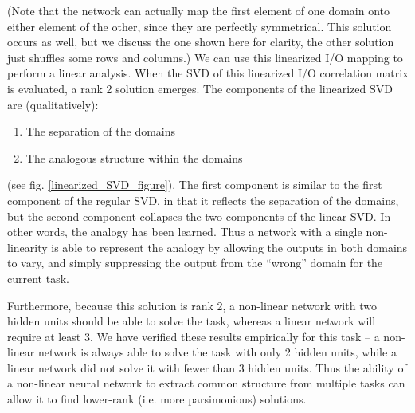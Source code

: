 \documentclass[10pt,letterpaper]{article}
\begin{document}
(Note that the network can actually map the first element of one domain onto either element of the other, since they are perfectly symmetrical. This solution occurs as well, but we discuss the one shown here for clarity, the other solution just shuffles some rows and columns.) We can use this linearized I/O mapping to perform a linear analysis. When the SVD of this linearized I/O correlation matrix is evaluated, a rank 2 solution emerges. The components of the linearized SVD are (qualitatively): \begin{enumerate}
\itemsep-0.25em
\item The separation of the domains
\item The analogous structure within the domains
\end{enumerate}
(see fig. \ref{linearized_SVD_figure}). The first component is similar to the first component of the regular SVD, in that it reflects the separation of the domains, but the second component collapses the two components of the linear SVD. In other words, the analogy has been learned. Thus a network with a single non-linearity is able to represent the analogy by allowing the outputs in both domains to vary, and simply suppressing the output from the ``wrong'' domain for the current task.\par
Furthermore, because this solution is rank 2, a non-linear network with two hidden units should be able to solve the task, whereas a linear network will require at least 3. We have verified these results empirically for this task -- a non-linear network is always able to solve the task with only 2 hidden units, while a linear network did not solve it with fewer than 3 hidden units. Thus the ability of a non-linear neural network to extract common structure from multiple tasks can allow it to find lower-rank (i.e. more parsimonious) solutions. 
\end{document}
